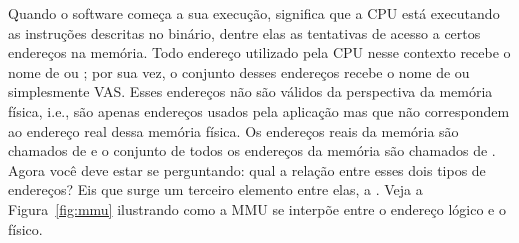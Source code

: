 




Quando o software começa a sua execução, significa que a CPU está executando as
instruções descritas no binário, dentre elas as tentativas de acesso a certos
endereços na memória. Todo endereço utilizado pela CPU nesse contexto recebe o
nome de  ou ; por
sua vez, o conjunto desses endereços recebe o nome de  ou simplesmente VAS. Esses
endereços não são válidos da perspectiva da memória física, i.e., são apenas
endereços usados pela aplicação mas que não correspondem ao endereço real dessa
memória física. Os endereços reais da memória são chamados de
 e o conjunto de todos os endereços da memória
são chamados de . Agora você deve
estar se perguntando: qual a relação entre esses dois tipos de endereços? Eis
que surge um terceiro elemento entre elas, a . Veja a Figura~\ref{fig:mmu} ilustrando como a MMU se interpõe
entre o endereço lógico e o físico.

